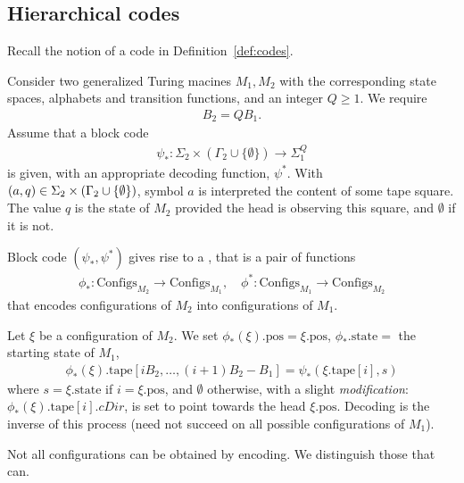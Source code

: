 \documentclass[12pt]{memoir}
\newcommand{\fld}[1]{\ensuremath{\textit{#1}}}
\def\B{B}
\newcommand{\Configs}{\mathrm{Configs}}
\newcommand{\pos}{\mathrm{pos}}
\newcommand{\cDir}{\fld{cDir}}
\newcommand{\state}{\mathrm{state}}
\newcommand{\tape}{\mathrm{tape}}
\begin{document}
\subsection{Hierarchical codes}\label{sec:hier-codes}

Recall the notion of a code in Definition~\ref{def:codes}.

\begin{definition}\label{def:configuration-code}
Consider two generalized Turing macines \( M_{1},M_{2} \) with the corresponding
state spaces, alphabets and transition functions, and an integer \( Q\ge 1 \).
We require
\begin{align}\label{eq:B_2-B_1-Q}
  \B_{2} = Q \B_{1}.
\end{align}
Assume that a block code
\begin{align*}
   \psi_{*}:\Sigma_{2}\times(\Gamma_{2}\cup\{\emptyset\})\to\Sigma_{1}^{Q}
 \end{align*}
is given, with an appropriate decoding function, \( \psi^{*} \).
With \( (a,q)\in\Sigma_{2}\times(\Gamma_{2}\cup\{\emptyset\}) \),
symbol \( a \) is interpreted the content of some tape square.
The value \( q \) is the state of \( M_{2} \) provided the head is observing this square,
and \( \emptyset \) if it is not.

Block code \( (\psi_{*},\psi^{*}) \) gives rise to a 
, that is a pair of functions
    \begin{align*}
        \phi_{*} :\Configs_{M_2} \to \Configs_{M_1},
        \quad
        \phi^{*}:\Configs_{M_1} \to \Configs_{M_2}
    \end{align*}
    that encodes configurations of \( M_2 \) into configurations of \( M_{1} \).

Let \( \xi \) be a configuration of \( M_2 \).
We set \( \phi_*(\xi).\pos = \xi.\pos \), \(\phi_{*}.\state=  \) 
the starting state of \( M_{1} \),
\begin{align*}
 \phi_*(\xi).\tape[i\B_2, \dots, (i+1)\B_2 - \B_1] = \psi_*(\xi.\tape[i], s)
 \end{align*}
where \( s=\xi.\state \) if \( i = \xi.\pos \), and \( \emptyset \) otherwise, with
a slight \emph{modification}: 
\( \phi_*(\xi).\tape[i].\cDir \), is set to point towards the head \( \xi.\pos \).
Decoding is the inverse of this process (need not succeed on all possible configurations
of \( M_{1} \)).
 \end{definition}

 Not all configurations can be obtained by encoding.
 We distinguish those that can.
\end{document}
